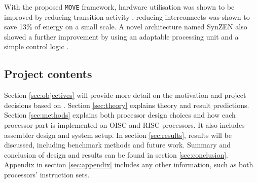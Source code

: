 With the proposed \texttt{MOVE} framework, hardware utilisation was shown to be improved by reducing transition activity \autocite{1207041}, reducing interconnects was shown to save 13\% of energy \autocite{6972455} on a small scale. A novel architecture named SynZEN also showed a further improvement by using an adaptable processing unit and a simple control logic \autocite{6403142}.

\subsection{Project contents}
Section \ref{sec:objectives} will provide more detail on the motivation and project decisions based on . Section \ref{sec:theory} explains theory and result predictions. Section \ref{sec:methods} explains both processor design choices and how each processor part is implemented on OISC and RISC processors. It also includes assembler design and system setup. In section \ref{sec:results}, results will be discussed, including benchmark methods and future work. Summary and conclusion of design and results can be found in section \ref{sec:conclusion}. Appendix in section \ref{sec:appendix} includes any other information, such as both processors' instruction sets.
